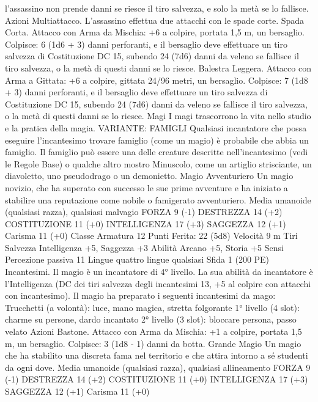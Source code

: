 \begin{multicols}{2}
l’assassino non prende danni se riesce il tiro salvezza, e solo la
metà se lo fallisce.
Azioni
Multiattacco. L’assassino effettua due attacchi con le spade corte.
Spada Corta. Attacco con Arma da Mischia: +6 a colpire, portata
1,5 m, un bersaglio.
Colpisce: 6 (1d6 + 3) danni perforanti, e il bersaglio deve effettuare un
tiro salvezza di Costituzione DC 15, subendo 24 (7d6) danni da veleno se
fallisce il tiro salvezza, o la metà di questi danni se lo riesce.
Balestra Leggera. Attacco con Arma a Gittata: +6 a colpire,
gittata 24/96 metri, un bersaglio.
Colpisce: 7 (1d8 + 3) danni perforanti, e il bersaglio deve effettuare un
tiro salvezza di Costituzione DC 15, subendo 24 (7d6) danni da veleno se
fallisce il tiro salvezza, o la metà di questi danni se lo riesce.
Magi
I magi trascorrono la vita nello studio e la pratica della
magia.
VARIANTE: FAMIGLI
Qualsiasi incantatore che possa eseguire l’incantesimo trovare
famiglio (come un magio) è probabile che abbia un famiglio. Il
famiglio può essere una delle creature descritte nell’incantesimo
(vedi le Regole Base) o qualche altro mostro Minuscolo, come
un artiglio strisciante, un diavoletto, uno pseudodrago o un
demonietto.
Magio Avventuriero
Un magio novizio, che ha superato con successo le sue
prime avventure e ha iniziato a stabilire una
reputazione come nobile o famigerato avventuriero.
Media umanoide (qualsiasi razza), qualsiasi malvagio
FORZA 9 (-1)
DESTREZZA 14 (+2)
COSTITUZIONE 11 (+0)
INTELLIGENZA 17 (+3)
SAGGEZZA 12 (+1)
Carisma 11 (+0)
Classe Armatura 12
\hspace*{0pt}\hfill{Punti Ferita}: 22 (5d8)
Velocità 9 m
Tiri Salvezza Intelligenza +5, Saggezza +3
Abilità Arcano +5, Storia +5
Sensi Percezione passiva 11
Lingue quattro lingue qualsiasi
Sfida 1 (200 PE)
Incantesimi. Il magio è un incantatore di 4° livello. La sua
abilità da incantatore è l’Intelligenza (DC dei tiri salvezza degli
incantesimi 13, +5 al colpire con attacchi con incantesimo). Il
magio ha preparato i seguenti incantesimi da mago:
Trucchetti (a volontà): luce, mano magica, stretta folgorante
1° livello (4 slot): charme su persone, dardo incantato
2° livello (3 slot): bloccare persona, passo velato
Azioni
Bastone. Attacco con Arma da Mischia: +1 a colpire, portata 1,5
m, un bersaglio.
Colpisce: 3 (1d8 - 1) danni da botta.
Grande Magio
Un magio che ha stabilito una discreta fama nel
territorio e che attira intorno a sé studenti da ogni dove.
Media umanoide (qualsiasi razza), qualsiasi allineamento
FORZA 9 (-1)
DESTREZZA 14 (+2)
COSTITUZIONE 11 (+0)
INTELLIGENZA 17 (+3)
SAGGEZZA 12 (+1)
Carisma 11 (+0)

\end{multicols}
